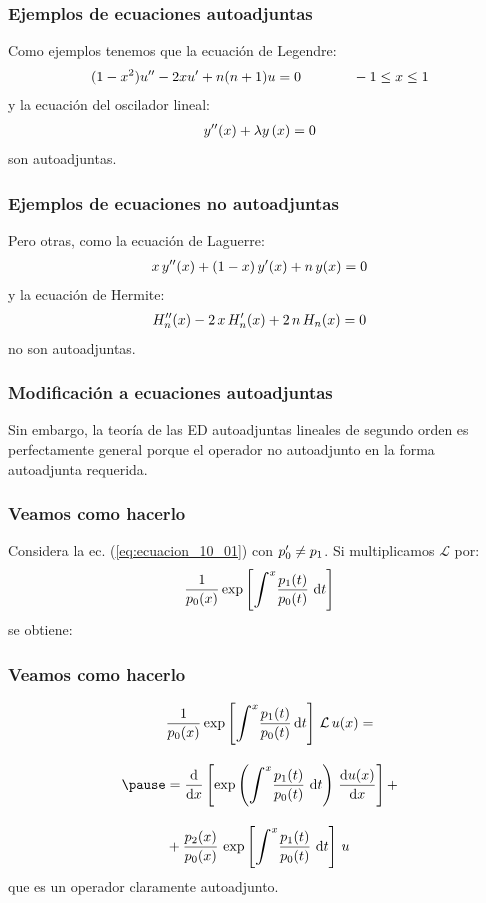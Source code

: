 \documentclass[12pt]{beamer}
\begin{document}
\begin{frame}
\frametitle{Ejemplos de ecuaciones autoadjuntas}
Como ejemplos tenemos que la ecuación de Legendre:
\pause
\begin{align*}
(1 - x^{2}) {u}^{\prime \prime} - 2 x {u}^{\prime} + n (n + 1) u = 0 \hspace{1.3cm} -1 \leq x \leq 1  
\end{align*}
\pause
y la ecuación del oscilador lineal:
\begin{align*}
{y}^{\prime \prime} (x) + \lambda y \, (x) = 0
\end{align*}
son autoadjuntas.
\end{frame}
\begin{frame}
\frametitle{Ejemplos de ecuaciones no autoadjuntas}
Pero otras, como la ecuación de Laguerre:
\begin{align*}
x \, {y}^{\prime \prime} (x) + (1 - x) \, {y}^{\prime} (x) + n \, y (x) = 0
\end{align*}
\pause
y la ecuación de Hermite:
\begin{align*}
{H}^{\prime \prime}_{n} (x) - 2 \, x \, {H}^{\prime}_{n} (x) + 2 \, n \, H_{n} (x) = 0
\end{align*}
no son autoadjuntas.
\end{frame}
\begin{frame}
\frametitle{Modificación a ecuaciones autoadjuntas}
Sin embargo, la teoría de las ED autoadjuntas lineales de segundo orden es perfectamente general porque  el operador no autoadjunto en la forma autoadjunta requerida.
\end{frame}
\begin{frame}
\frametitle{Veamos como hacerlo}
Considera la ec. (\ref{eq:ecuacion_10_01}) con ${p}^{\prime}_{0} \neq p_{1}$. \pause Si multiplicamos $\mathcal{L}$ por:
\pause
\begin{align*}
\dfrac{1}{p_{0} (x)} \exp \left[ \scaleint{6ex}^{x} \dfrac{p_{1} (t)}{p_{0} (t)} \, \dd{t} \right]
\end{align*}
se obtiene:
\end{frame}
\begin{frame}
\frametitle{Veamos como hacerlo}
\begin{eqnarray}
\begin{aligned}
&\dfrac{1}{p_{0} (x)} \exp \left[ \scaleint{6ex}^{x} \dfrac{p_{1} (t)}{p_{0} (t)} \dd{t} \right] \, \mathcal{L} \, u (x) = \\[1em] \pause
&= \dv{x} \left[ \exp \left( \scaleint{6ex}^{x} \dfrac{p_{1} (t)}{p_{0} (t)} \, \dd{t} \right) \, \dv{u (x)}{x} \right] + \\[1em] 
&+ \dfrac{p_{2} (x)}{p_{0} (x)} \, \exp \left[ \scaleint{6ex}^{x} \dfrac{p_{1} (t)}{p_{0} (t)} \, \dd{t} \right] \, u
\end{aligned}
\label{eq:ecuacion_10_07}
\end{eqnarray}
que es un operador claramente autoadjunto.
\end{frame}
\end{document}
